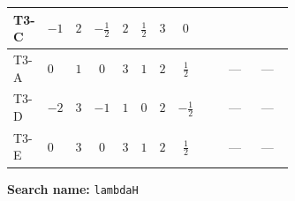 \documentclass[8pt]{article}
\begin{document}
\begin{landscape}
\begin{longtable}{@{}llcccccc >{\raggedright\arraybackslash}p{0.21\linewidth} >{\raggedright\arraybackslash}p{0.21\linewidth} >{\raggedright\arraybackslash}p{0.21\linewidth}@{}}
\midrule
T3-C & $-1$ & $2$ & $-\frac{1}{2}$ & $2$ & $\frac{1}{2}$ & $3$ & $0$ & \scriptsize\adjustbox{max width=\linewidth}{$\begin{gathered} -12 \operatorname{Tr}\!\left({Y_u}\,\left({Y_u}\right)^{\dagger}\,{Y_u}\,\left({Y_u}\right)^{\dagger}\right)\end{gathered}$} & \scriptsize\adjustbox{max width=\linewidth}{$\begin{gathered} +8 {\lambda_{H^\dagger H^\dagger S_1^\dagger S_1^\dagger}} \left({\lambda_{H^\dagger H^\dagger S_1^\dagger S_1^\dagger}}\right)^{*}\end{gathered}$} & \scriptsize\adjustbox{max width=\linewidth}{$\begin{gathered} +4 {\lambda_{H H^\dagger S_1^\dagger S_2^\dagger}^{\rm Cross}} \left({\lambda_{H H^\dagger S_1^\dagger S_2^\dagger}^{\rm Cross}}\right)^{*}\end{gathered}$} \\
\midrule
T3-A & $0$ & $1$ & $0$ & $3$ & $1$ & $2$ & $\frac{1}{2}$ & \scriptsize\adjustbox{max width=\linewidth}{$\begin{gathered} -12 \operatorname{Tr}\!\left({Y_u}\,\left({Y_u}\right)^{\dagger}\,{Y_u}\,\left({Y_u}\right)^{\dagger}\right)\end{gathered}$} & --- & --- \\
\midrule
T3-D & $-2$ & $3$ & $-1$ & $1$ & $0$ & $2$ & $-\frac{1}{2}$ & \scriptsize\adjustbox{max width=\linewidth}{$\begin{gathered} -12 \operatorname{Tr}\!\left({Y_u}\,\left({Y_u}\right)^{\dagger}\,{Y_u}\,\left({Y_u}\right)^{\dagger}\right)\end{gathered}$} & --- & --- \\
\midrule
T3-E & $0$ & $3$ & $0$ & $3$ & $1$ & $2$ & $\frac{1}{2}$ & \scriptsize\adjustbox{max width=\linewidth}{$\begin{gathered} -12 \operatorname{Tr}\!\left({Y_u}\,\left({Y_u}\right)^{\dagger}\,{Y_u}\,\left({Y_u}\right)^{\dagger}\right)\end{gathered}$} & --- & --- \\
\midrule
\bottomrule
\end{longtable}
\clearpage
\noindent\textbf{Search name: }\texttt{lambdaH}\par\smallskip

\end{landscape}
\end{document}
